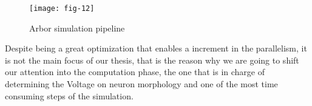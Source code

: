 \vspace{5ex}
\begin{figure}[htbp]
    \centering
    \texttt{[image: fig-12]}
    \label{fig:12}
    \caption{Arbor simulation pipeline}
\end{figure}

Despite being a great optimization that enables a increment in the parallelism,
it is not the main focus of our thesis, that is the reason why we are going to shift
our attention into the computation phase, the one that is in charge of determining
the Voltage on neuron morphology and one of the most time consuming steps of the
simulation.



